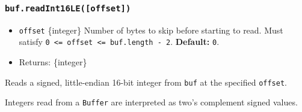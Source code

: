 \subsubsection{\texorpdfstring{\texttt{buf.readInt16LE({[}offset{]})}}{buf.readInt16LE({[}offset{]})}}\label{buf.readint16leoffset}

\begin{itemize}
\tightlist
\item
  \texttt{offset} \{integer\} Number of bytes to skip before starting to
  read. Must satisfy
  \texttt{0\ \textless{}=\ offset\ \textless{}=\ buf.length\ -\ 2}.
  \textbf{Default:} \texttt{0}.
\item
  Returns: \{integer\}
\end{itemize}

Reads a signed, little-endian 16-bit integer from \texttt{buf} at the
specified \texttt{offset}.

Integers read from a \texttt{Buffer} are interpreted as two's complement
signed values.

\begin{Shaded}
\begin{Highlighting}[]
\NormalTok{ \{ }\NormalTok{ \} } \OperatorTok{;}

\OperatorTok{=} \NormalTok{([}\OperatorTok{,} \NormalTok{])}\OperatorTok{;}

\NormalTok{(}\NormalTok{))}\OperatorTok{;}
\NormalTok{(}\NormalTok{))}\OperatorTok{;}
\end{Highlighting}
\end{Shaded}

\begin{Shaded}
\begin{Highlighting}[]
\NormalTok{ \{ }\NormalTok{ \} }\OperatorTok{=} \NormalTok{(}\NormalTok{)}\OperatorTok{;}

\OperatorTok{=} \NormalTok{([}\OperatorTok{,} \NormalTok{])}\OperatorTok{;}

\NormalTok{(}\NormalTok{))}\OperatorTok{;}
\NormalTok{(}\NormalTok{))}\OperatorTok{;}
\end{Highlighting}
\end{Shaded}

